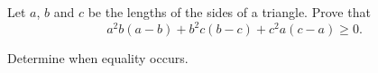 Let $ a$,  $ b$ and $ c$ be the lengths of the sides of a triangle. Prove that\[ a^{2}b(a - b) + b^{2}c(b - c) + c^{2}a(c - a)\ge 0.
\]

Determine when equality occurs.
